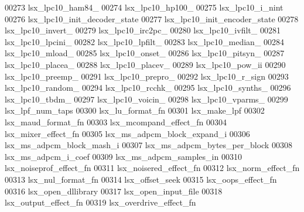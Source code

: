 \begin{DoxyCode}
00273 \textcolor{stringliteral}{lsx\_lpc10\_ham84\_}
00274 \textcolor{stringliteral}{lsx\_lpc10\_hp100\_}
00275 \textcolor{stringliteral}{lsx\_lpc10\_i\_nint}
00276 \textcolor{stringliteral}{lsx\_lpc10\_init\_decoder\_state}
00277 \textcolor{stringliteral}{lsx\_lpc10\_init\_encoder\_state}
00278 \textcolor{stringliteral}{lsx\_lpc10\_invert\_}
00279 \textcolor{stringliteral}{lsx\_lpc10\_irc2pc\_}
00280 \textcolor{stringliteral}{lsx\_lpc10\_ivfilt\_}
00281 \textcolor{stringliteral}{lsx\_lpc10\_lpcini\_}
00282 \textcolor{stringliteral}{lsx\_lpc10\_lpfilt\_}
00283 \textcolor{stringliteral}{lsx\_lpc10\_median\_}
00284 \textcolor{stringliteral}{lsx\_lpc10\_mload\_}
00285 \textcolor{stringliteral}{lsx\_lpc10\_onset\_}
00286 \textcolor{stringliteral}{lsx\_lpc10\_pitsyn\_}
00287 \textcolor{stringliteral}{lsx\_lpc10\_placea\_}
00288 \textcolor{stringliteral}{lsx\_lpc10\_placev\_}
00289 \textcolor{stringliteral}{lsx\_lpc10\_pow\_ii}
00290 \textcolor{stringliteral}{lsx\_lpc10\_preemp\_}
00291 \textcolor{stringliteral}{lsx\_lpc10\_prepro\_}
00292 \textcolor{stringliteral}{lsx\_lpc10\_r\_sign}
00293 \textcolor{stringliteral}{lsx\_lpc10\_random\_}
00294 \textcolor{stringliteral}{lsx\_lpc10\_rcchk\_}
00295 \textcolor{stringliteral}{lsx\_lpc10\_synths\_}
00296 \textcolor{stringliteral}{lsx\_lpc10\_tbdm\_}
00297 \textcolor{stringliteral}{lsx\_lpc10\_voicin\_}
00298 \textcolor{stringliteral}{lsx\_lpc10\_vparms\_}
00299 \textcolor{stringliteral}{lsx\_lpf\_num\_taps}
00300 \textcolor{stringliteral}{lsx\_lu\_format\_fn}
00301 \textcolor{stringliteral}{lsx\_make\_lpf}
00302 \textcolor{stringliteral}{lsx\_maud\_format\_fn}
00303 \textcolor{stringliteral}{lsx\_mcompand\_effect\_fn}
00304 \textcolor{stringliteral}{lsx\_mixer\_effect\_fn}
00305 \textcolor{stringliteral}{lsx\_ms\_adpcm\_block\_expand\_i}
00306 \textcolor{stringliteral}{lsx\_ms\_adpcm\_block\_mash\_i}
00307 \textcolor{stringliteral}{lsx\_ms\_adpcm\_bytes\_per\_block}
00308 \textcolor{stringliteral}{lsx\_ms\_adpcm\_i\_coef}
00309 \textcolor{stringliteral}{lsx\_ms\_adpcm\_samples\_in}
00310 \textcolor{stringliteral}{lsx\_noiseprof\_effect\_fn}
00311 \textcolor{stringliteral}{lsx\_noisered\_effect\_fn}
00312 \textcolor{stringliteral}{lsx\_norm\_effect\_fn}
00313 \textcolor{stringliteral}{lsx\_nul\_format\_fn}
00314 \textcolor{stringliteral}{lsx\_offset\_seek}
00315 \textcolor{stringliteral}{lsx\_oops\_effect\_fn}
00316 \textcolor{stringliteral}{lsx\_open\_dllibrary}
00317 \textcolor{stringliteral}{lsx\_open\_input\_file}
00318 \textcolor{stringliteral}{lsx\_output\_effect\_fn}
00319 \textcolor{stringliteral}{lsx\_overdrive\_effect\_fn}

\end{DoxyCode}
